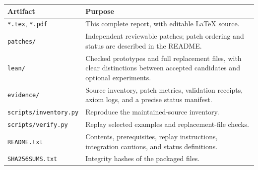\documentclass[11pt,letterpaper]{article}
\begin{document}
\begin{longtable}{@{}p{}p{}@{}}
\toprule
Artifact & Purpose\\
\midrule
\endhead
\texttt{*.tex}, \texttt{*.pdf} & This complete report, with editable LaTeX source.\\
\texttt{patches/} & Independent reviewable patches; patch ordering and status
are described in the README.\\
\texttt{lean/} & Checked prototypes and full replacement files, with clear
distinctions between accepted candidates and optional experiments.\\
\texttt{evidence/} & Source inventory, patch metrics, validation receipts,
axiom logs, and a precise status manifest.\\
\texttt{scripts/inventory.py} & Reproduce the maintained-source inventory.\\
\texttt{scripts/verify.py} & Replay selected examples and replacement-file checks.\\
\texttt{README.txt} & Contents, prerequisites, replay instructions,
integration cautions, and status definitions.\\
\texttt{SHA256SUMS.txt} & Integrity hashes of the packaged files.\\
\bottomrule
\end{longtable}
\end{document}
